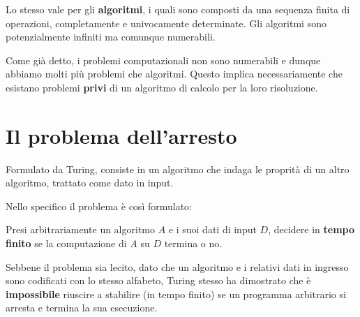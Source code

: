 Lo stesso vale per gli \textbf{algoritmi}, i quali sono composti da una sequenza finita di operazioni, completamente
e univocamente determinate. Gli algoritmi sono potenzialmente infiniti ma comunque numerabili.

Come gi\`a detto, i problemi computazionali non sono numerabili e dunque abbiamo molti pi\`u problemi che algoritmi.
Questo implica necessariamente che esistano problemi \textbf{privi} di un algoritmo di calcolo per la loro risoluzione.

\section{Il problema dell'arresto}\label{arresto}
Formulato da Turing, consiste in un algoritmo che indaga le proprit\`a di un altro algoritmo, trattato come dato in
input.

Nello specifico il problema \`e cos\`i formulato:
\begin{center}
	Presi arbitrariamente un algoritmo $A$ e i suoi dati di input $D$, decidere in \textbf{tempo finito} se la computazione
	di $A$ su $D$ termina o no.
\end{center}

Sebbene il problema sia lecito, dato che un algoritmo e i relativi dati in ingresso sono codificati con lo stesso
alfabeto, Turing stesso ha dimostrato che \`e \textbf{impossibile} riuscire a stabilire (in tempo finito) se un
programma arbitrario si arresta e termina la sua esecuzione.

